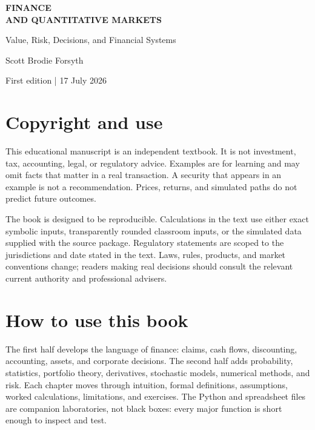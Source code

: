 \documentclass[11pt,oneside,openany]{book}
\begin{document}
\hypersetup{pageanchor=false}
\begin{titlepage}
  \pagecolor{navy}
  \color{white}
  \vspace*{0.20\textheight}
  {\Huge\bfseries FINANCE\\[7pt]AND QUANTITATIVE MARKETS\par}
  \vspace{18pt}
  {\Large Value, Risk, Decisions, and Financial Systems\par}
  \vfill
  {\large Scott Brodie Forsyth\par}
  \vspace{10pt}
  {\small First edition | 17 July 2026\par}
\end{titlepage}
\nopagecolor
\color{black}
\hypersetup{pageanchor=true}

\frontmatter

\chapter*{Copyright and use}
This educational manuscript is an independent textbook. It is not investment, tax, accounting, legal, or regulatory advice. Examples are for learning and may omit facts that matter in a real transaction. A security that appears in an example is not a recommendation. Prices, returns, and simulated paths do not predict future outcomes.

The book is designed to be reproducible. Calculations in the text use either exact symbolic inputs, transparently rounded classroom inputs, or the simulated data supplied with the source package. Regulatory statements are scoped to the jurisdictions and date stated in the text. Laws, rules, products, and market conventions change; readers making real decisions should consult the relevant current authority and professional advisers.

\chapter*{How to use this book}
The first half develops the language of finance: claims, cash flows, discounting, accounting, assets, and corporate decisions. The second half adds probability, statistics, portfolio theory, derivatives, stochastic models, numerical methods, and risk. Each chapter moves through intuition, formal definitions, assumptions, worked calculations, limitations, and exercises. The Python and spreadsheet files are companion laboratories, not black boxes: every major function is short enough to inspect and test.
\end{document}
